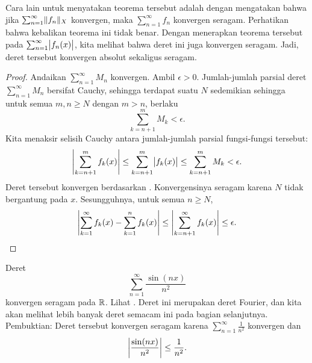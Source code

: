 Cara lain untuk menyatakan teorema tersebut adalah dengan mengatakan bahwa jika
$\sum_{n=1}^\infty \lVert {f_n} \rVert_X$ konvergen, maka $\sum_{n=1}^\infty f_n$ konvergen seragam.
Perhatikan bahwa kebalikan teorema ini tidak benar.
Dengan menerapkan teorema tersebut pada $\sum_{n=1}^\infty \bigl\lvert {f_n(x)} \bigr\rvert$, kita
melihat bahwa deret ini juga konvergen seragam. Jadi, deret tersebut konvergen absolut
sekaligus seragam.

\begin{proof}
Andaikan $\sum_{n=1}^\infty M_n$ konvergen. Ambil $\epsilon > 0$.
Jumlah-jumlah parsial deret $\sum_{n=1}^\infty M_n$ bersifat Cauchy, sehingga
terdapat suatu $N$ sedemikian sehingga untuk semua $m, n \geq N$ dengan $m > n$, berlaku
\begin{equation*}
\sum_{k=n+1}^m M_k < \epsilon .
\end{equation*}
Kita menaksir selisih Cauchy antara jumlah-jumlah parsial
fungsi-fungsi tersebut:
\begin{equation*}
\left\lvert {\sum_{k=n+1}^m f_k(x)} \right\rvert \leq
\sum_{k=n+1}^m \bigl\lvert {f_k(x)} \bigr\rvert \leq
\sum_{k=n+1}^m M_k < \epsilon .
\end{equation*}
Deret tersebut konvergen berdasarkan .
Konvergensinya seragam karena $N$ tidak bergantung pada $x$.
Sesungguhnya, untuk semua $n \geq N$,
\begin{equation*}
\left\lvert {\sum_{k=1}^\infty f_k(x) - \sum_{k=1}^n f_k(x)} \right\rvert \leq
\left\lvert {\sum_{k=n+1}^\infty f_k(x)} \right\rvert \leq \epsilon .
\qedhere
\end{equation*}
\end{proof}

\begin{example} \label{example:sinnsqfourier}
Deret
\begin{equation*}
\sum_{n=1}^\infty \frac{\sin(nx)}{n^2}
\end{equation*}
konvergen seragam pada ${\mathbb{R}}$. Lihat .
Deret ini merupakan deret Fourier, dan
kita akan melihat lebih banyak deret semacam ini pada bagian selanjutnya. Pembuktian:
Deret tersebut konvergen seragam karena
$\sum_{n=1}^\infty \frac{1}{n^2}$
konvergen dan
\begin{equation*}
\left\lvert {\frac{\sin(nx)}{n^2}} \right\rvert \leq 
\frac{1}{n^2} .
\end{equation*}
\end{example}

\begin{myfigureht}
\caption{Grafik
$\sum_{n=1}^\infty \frac{\sin(n x)}{n^2}$ yang mencakup
8 jumlah parsial pertamanya dalam berbagai nuansa abu-abu.\label{fig:fouriersern2}}
\end{myfigureht}

